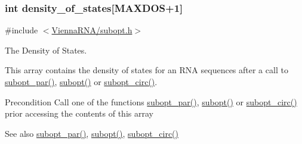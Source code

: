 \subsubsection[{density\+\_\+of\+\_\+states}]{\setlength{\rightskip}{0pt plus 5cm}int density\+\_\+of\+\_\+states\mbox{[}{\bf M\+A\+X\+D\+O\+S}+1\mbox{]}}\label{group__dos_ga937634a76b46a22530a74906f1957a9e}


{\ttfamily \#include $<$\hyperlink{subopt_8h}{Vienna\+R\+N\+A/subopt.\+h}$>$}



The Density of States. 

This array contains the density of states for an R\+N\+A sequences after a call to \hyperlink{group__subopt__wuchty_gaa1e1e7031a948ebcb39a9d58d1e9842c}{subopt\+\_\+par()}, \hyperlink{group__subopt__wuchty_ga700f662506a233e42dd7fda74fafd40e}{subopt()} or \hyperlink{group__subopt__wuchty_ga8634516e4740e0b6c9a46d2bae940340}{subopt\+\_\+circ()}.

\begin{DoxyPrecond}{Precondition}
Call one of the functions \hyperlink{group__subopt__wuchty_gaa1e1e7031a948ebcb39a9d58d1e9842c}{subopt\+\_\+par()}, \hyperlink{group__subopt__wuchty_ga700f662506a233e42dd7fda74fafd40e}{subopt()} or \hyperlink{group__subopt__wuchty_ga8634516e4740e0b6c9a46d2bae940340}{subopt\+\_\+circ()} prior accessing the contents of this array 
\end{DoxyPrecond}
\begin{DoxySeeAlso}{See also}
\hyperlink{group__subopt__wuchty_gaa1e1e7031a948ebcb39a9d58d1e9842c}{subopt\+\_\+par()}, \hyperlink{group__subopt__wuchty_ga700f662506a233e42dd7fda74fafd40e}{subopt()}, \hyperlink{group__subopt__wuchty_ga8634516e4740e0b6c9a46d2bae940340}{subopt\+\_\+circ()} 
\end{DoxySeeAlso}
